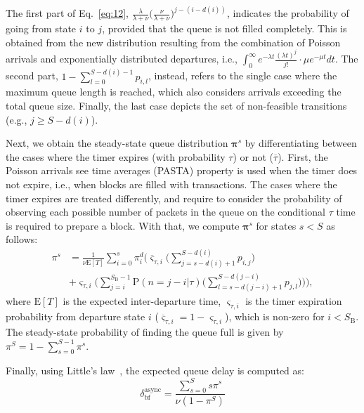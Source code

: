 \documentclass[lettersize,journal]{IEEEtran}
\begin{document}
The first part of Eq.~\eqref{eq:12}, $\frac{\lambda}{\lambda + \nu} \Big(\frac{\nu}{\lambda + \nu}\Big)^{j-(i-d(i))}$, indicates the probability of going from state $i$ to $j$, provided that the queue is not filled completely. This is obtained from the new distribution resulting from the combination of Poisson arrivals and exponentially distributed departures, i.e., $\int_{0}^\infty e^{-\lambda t} \frac{(\lambda t)^{j}}{j!} \cdot \mu e^{-\mu t} dt$. The second part, $1-\sum^{S-d(i)-1}_{l=0} p_{i,l}$, instead, refers to the single case where the maximum queue length is reached, which also considers arrivals exceeding the total queue size. Finally, the last case depicts the set of non-feasible transitions (e.g., $j \geq S-d(i)$).

Next, we obtain the steady-state queue distribution $\boldsymbol{\pi}^s$ by differentiating between the cases where the timer expires (with probability $\tau$) or not ($\overline{\tau}$). First, the Poisson arrivals see time averages (PASTA) property is used when the timer does not expire, i.e., when blocks are filled with transactions. The cases where the timer expires are treated differently, and require to consider the probability of observing each possible number of packets in the queue on the conditional $\tau$ time is required to prepare a block. With that, we compute $\boldsymbol{\pi}^s$ for states $s < S$ as follows:
\begin{equation}
\begin{split}
\pi^s &= \frac{1}{\nu \text{E}[T]} \sum_{i=0}^s \pi_i^d \bigg( \overline{\varsigma}_{\tau,i} \Big( \sum_{j=s-d(i)+1}^{S-d(i)} p_{i,j} \Big) \\
&+ \varsigma_{\tau,i} \Big( \sum_{j=i}^{S_\text{B}-1} \text{P}(n=j-i|\tau) \big(\sum_{l=s-d(j-i)+1}^{S-d(j-i)} p_{j,l}\big) \Big) \bigg),
\end{split}
\end{equation}
where $\text{E}[T]$ is the expected inter-departure time, $\varsigma_{\tau,i}$ is the timer expiration probability from departure state $i$ ($\overline{\varsigma}_{\tau,i} = 1 - \varsigma_{\tau,i}$), which is non-zero for $i<S_\text{B}$. The steady-state probability of finding the queue full is given by $\pi^S = 1-\sum^{S-1}_{s=0} \pi^{s}$. 

Finally, using Little's law~\cite{shortle2018fundamentals}, the expected queue delay is computed as:
\begin{equation}
\delta_\text{bf}^\text{async} = \frac{\sum_{s=0}^S s \pi^s}{\nu(1-\pi^S)}
\end{equation}
\end{document}
